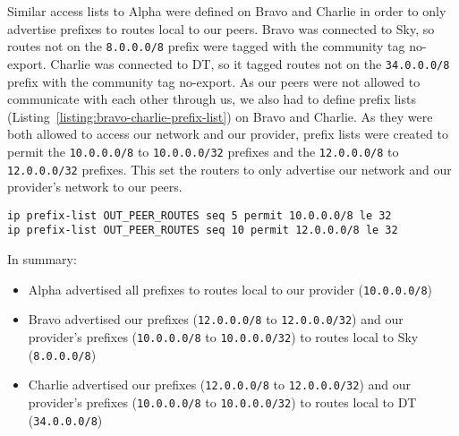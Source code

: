 Similar access lists to Alpha were defined on Bravo and Charlie in order to
only advertise prefixes to routes local to our peers. Bravo was connected to
Sky, so routes not on the \texttt{8.0.0.0/8} prefix were tagged with the
community tag no-export. Charlie was connected to DT, so it tagged routes not
on the \texttt{34.0.0.0/8} prefix with the community tag no-export. As our
peers were not allowed to communicate with each other through us, we also had
to define prefix lists (Listing~\ref{listing:bravo-charlie-prefix-list}) on Bravo and Charlie. As they were both allowed to
access our network and our provider, prefix lists were created to permit the
\texttt{10.0.0.0/8} to \texttt{10.0.0.0/32} prefixes and the
\texttt{12.0.0.0/8} to \texttt{12.0.0.0/32} prefixes. This set the routers to
only advertise our network and our provider's network to our peers.

\begin{lstlisting}[caption={Bravo and Charlie Prefix List}, label={listing:bravo-charlie-prefix-list}]
ip prefix-list OUT_PEER_ROUTES seq 5 permit 10.0.0.0/8 le 32
ip prefix-list OUT_PEER_ROUTES seq 10 permit 12.0.0.0/8 le 32
\end{lstlisting}

In summary:

\begin{itemize}
    \item Alpha advertised all prefixes to routes local to our provider
    (\texttt{10.0.0.0/8})

    \item Bravo advertised our prefixes (\texttt{12.0.0.0/8} to \texttt
    {12.0.0.0/32}) and our provider's prefixes (\texttt{10.0.0.0/8} to
    \texttt{10.0.0.0/32}) to routes local to Sky (\texttt{8.0.0.0/8})

    \item Charlie advertised our prefixes (\texttt{12.0.0.0/8} to \texttt
    {12.0.0.0/32}) and our provider's prefixes (\texttt{10.0.0.0/8} to \texttt
    {10.0.0.0/32}) to routes local to DT (\texttt{34.0.0.0/8})
\end{itemize}
